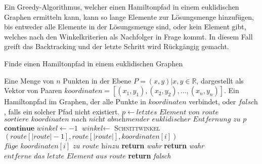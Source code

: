 \documentclass[a4paper,10pt,ngerman]{scrartcl}
\begin{document}
    Ein Greedy-Algorithmus, welcher einen Hamiltonpfad in einem euklidischen Graphen ermitteln kann,
    kann so lange Elemente zur Lösungsmenge hinzufügen, bis entweder alle Elemente in der Lösungsmenge sind,
    oder kein Element gibt, welches nach den Winkelkriterien als Nachfolger in Frage kommt.
    In diesem Fall greift das Backtracking und der letzte Schritt wird Rückgängig gemacht.

    \begin{algorithm}[H]
        \caption{Finde einen Hamiltonpfad in einem euklidischen Graphen}
        \begin{algorithmic}
            \Require Eine Menge von $n$ Punkten in der Ebene $P={(x,y)| x,y \in \mathbb{R}}$, dargestellt als Vektor von Paaren $\textit{koordinaten}=[(x_1,y_1), (x_2,y_2),\dots, (x_n,y_n)]$.
            \Ensure Ein Hamiltonpfad im Graphen, der alle Punkte in $\textit{koordinaten}$ verbindet, oder $\textit{falsch}$, falls ein solcher Pfad nicht existiert.
                    \State $p\gets \textit{letztes Element von } \textit{route}$
                    \State $\textit{sortiere } \textit{koordinaten } \textit{nach nicht abnehmender euklidischer Entfernung zu } p$
                \EndIf
                        \State $\textbf{continue}$
                    \EndIf
                    \State $\textit{winkel}\gets -1$
                        \State $\textit{winkel}\gets$ \textsc{Schnittwinkel}$(\textit{route}[|\textit{route}|-1], \textit{route}[|\textit{route}|], \textit{koordinaten}[i])$
                    \EndIf
                        \State $\textit{füge }\textit{koordinaten}[i]\textit{ zu route hinzu}$
                            \State \textbf{return} \textit{wahr}
                        \EndIf
                            \State \textbf{return} \textit{wahr}
                        \Else
                            \State $\textit{entferne das letzte Element aus route}$
                        \EndIf
                    \EndIf
                \EndFor
                \State \textbf{return} \textit{falsch}
            \EndFunction
        \end{algorithmic}\label{alg:pseudo_greedy}
    \end{algorithm}
\end{document}

